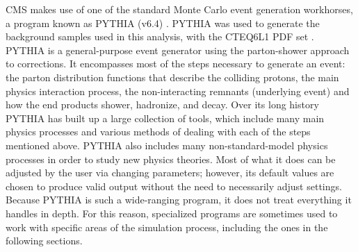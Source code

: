 




CMS makes use of one of the standard 
Monte Carlo event generation workhorses, 
a program known as PYTHIA (v6.4) 
\cite{PYTHIA6.4}. 
PYTHIA was used to generate the background 
samples used in this analysis, 
with the CTEQ6L1 PDF set \cite{CTEQ6L1}.  
PYTHIA is a general-purpose event generator 
using the parton-shower approach to corrections.  
It encompasses most of the steps necessary to generate 
an event: 
the parton distribution functions 
that describe the colliding protons, 
the main physics interaction process, 
the non-interacting remnants (underlying event)
and how the end products shower, 
hadronize, and decay.  
Over its long history PYTHIA has built up 
a large collection of tools, 
which include many main physics processes and 
various methods of dealing with each of the steps 
mentioned above.  
PYTHIA also includes many non-standard-model 
physics processes 
in order to study new physics theories.  
Most of what it does can be adjusted by the user 
via changing parameters; 
however, its default values are chosen to produce 
valid output without the need to 
necessarily adjust settings.  
Because PYTHIA is such a wide-ranging program, 
it does not treat everything it handles in depth.  
For this reason, specialized programs are sometimes used 
to work with specific areas of the simulation process, 
including the ones in the following sections.  


